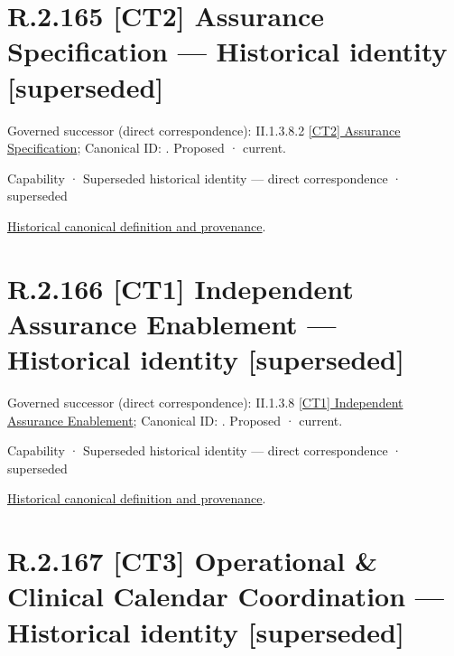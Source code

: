 \section*{R.2.165 [CT2] Assurance Specification — Historical identity [superseded]}
\label{navigation:R.2.165}

{\small Governed successor (direct correspondence): II.1.3.8.2 \hyperref[element:b81775d89d774cf8ba61731d13c67a54]{[CT2] Assurance Specification}; Canonical ID: \texttt{}. Proposed · current.}\par
\label{element:8006ee0dd95f4d7fb1f408fa09b6ce19}
{\small Capability · Superseded historical identity — direct correspondence · superseded}\par
\href{../../../../continuum/strategy/capability/8006ee0dd95f4d7fb1f408fa09b6ce19.md}{Historical canonical definition and provenance}.\par
\section*{R.2.166 [CT1] Independent Assurance Enablement — Historical identity [superseded]}
\label{navigation:R.2.166}

{\small Governed successor (direct correspondence): II.1.3.8 \hyperref[element:616682b612d244429e656b040e002d56]{[CT1] Independent Assurance Enablement}; Canonical ID: \texttt{}. Proposed · current.}\par
\label{element:88bf57b7a92c4c1da1b5f0a67d3ebd82}
{\small Capability · Superseded historical identity — direct correspondence · superseded}\par
\href{../../../../continuum/strategy/capability/88bf57b7a92c4c1da1b5f0a67d3ebd82.md}{Historical canonical definition and provenance}.\par
\section*{R.2.167 [CT3] Operational \& Clinical Calendar Coordination — Historical identity [superseded]}
\label{navigation:R.2.167}


